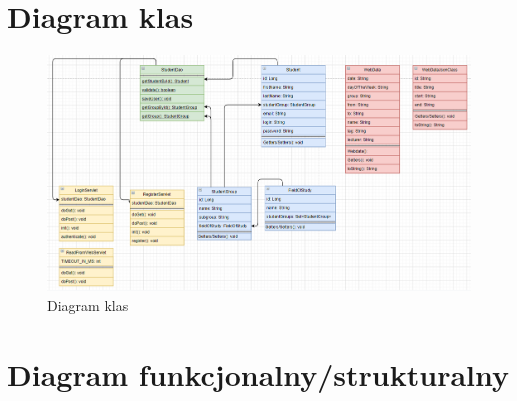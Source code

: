 \documentclass[a4paper,11pt]{uzreport}
\begin{document}
\section{Diagram klas}
\begin{figure}[ht!]
        \centering
        \includegraphics[width=6in]{pictures/Diagram_klas.png}
        \caption{Diagram klas}
        \label{fig3}
     \end{figure}


\section{Diagram funkcjonalny/strukturalny}


    
\clearpage
\end{document}
